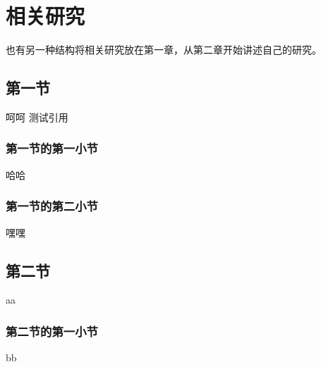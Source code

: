 
\chapter{相关研究}

也有另一种结构将相关研究放在第一章，从第二章开始讲述自己的研究。

\section{第一节}

呵呵
测试引用\cite{jin2015gpusgd}

\subsection{第一节的第一小节}

哈哈

\subsection{第一节的第二小节}

嘿嘿

\section{第二节}

aa

\subsection{第二节的第一小节}

bb
